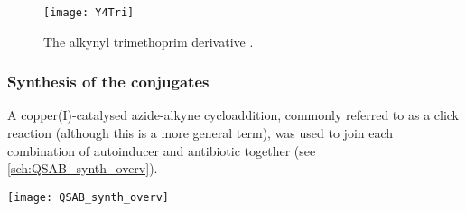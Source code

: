 \begin{figure}[H]
	\begin{center}
		\texttt{[image: Y4Tri]}
		\caption{The alkynyl trimethoprim derivative . \label{fgr:Y4Tri}}
	\end{center}
\end{figure}

\subsubsection{Synthesis of the conjugates}

A copper(I)-catalysed azide-alkyne cycloaddition\cite{Tornoe2002,ANIE:ANIE2596}, commonly referred to as a click reaction (although this is a more general term), was used to join each combination of autoinducer and antibiotic together (see \ref{sch:QSAB_synth_overv}). 

\begin{scheme}[H]
	\begin{center}
		\texttt{[image: QSAB\_synth\_overv]}
		\caption{The construction of the triazole-linked autoinducer-antibiotic conjugate library using a copper(I)-catalysed azide-alkyne cycloaddition. \label{sch:QSAB_synth_overv}}
	\end{center}
\end{scheme}
